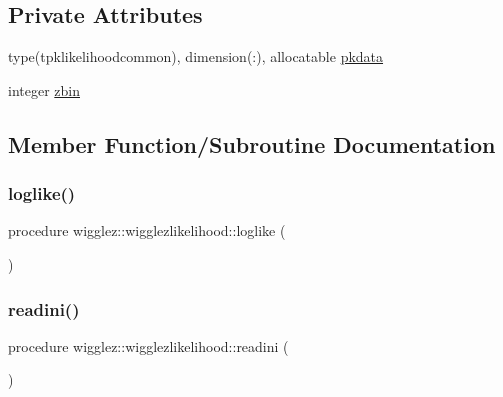\subsection*{Private Attributes}
\begin{DoxyCompactItemize}
\item 
type(tpklikelihoodcommon), dimension(\+:), allocatable \mbox{\hyperlink{structwigglez_1_1wigglezlikelihood_a3a904305f0c18155693de2962fc99138}{pkdata}}
\item 
integer \mbox{\hyperlink{structwigglez_1_1wigglezlikelihood_af5847a12e9443164c0849f3895cf1a62}{zbin}}
\end{DoxyCompactItemize}


\subsection{Member Function/\+Subroutine Documentation}
\mbox{\label{structwigglez_1_1wigglezlikelihood_a095302f5116a1ab5105fc9bc98c5927d}} 
\subsubsection{\texorpdfstring{loglike()}{loglike()}}
{\footnotesize\ttfamily procedure wigglez\+::wigglezlikelihood\+::loglike (\begin{DoxyParamCaption}{ }\end{DoxyParamCaption})\hspace{0.3cm}{\ttfamily [private]}}

\mbox{\label{structwigglez_1_1wigglezlikelihood_a2aac98147fcac57fe94ddad4442fe952}} 
\subsubsection{\texorpdfstring{readini()}{readini()}}
{\footnotesize\ttfamily procedure wigglez\+::wigglezlikelihood\+::readini (\begin{DoxyParamCaption}{ }\end{DoxyParamCaption})\hspace{0.3cm}{\ttfamily [private]}}



